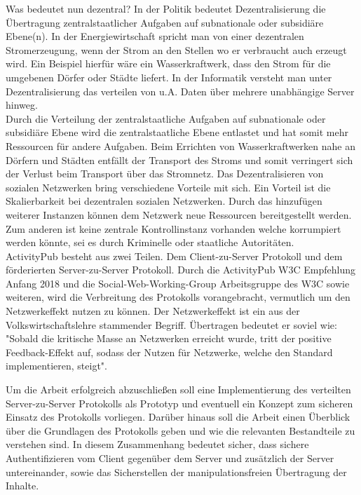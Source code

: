 {	Was bedeutet nun dezentral? In der Politik bedeutet Dezentralisierung \glqq die Übertragung zentralstaatlicher Aufgaben auf subnationale oder subsidiäre Ebene(n)\grqq\cite{wikipedia-dezentralisierung-politik}. In der Energiewirtschaft spricht man von einer \glqq dezentralen Stromerzeugung\grqq, wenn der Strom an den Stellen wo er verbraucht auch erzeugt wird. Ein Beispiel hierfür wäre ein Wasserkraftwerk, dass den Strom für die umgebenen Dörfer oder Städte liefert\cite{wikipedia-dezentralisierung-energie}. In der Informatik versteht man unter Dezentralisierung das verteilen von u.A. Daten über mehrere unabhängige Server hinweg.\\
	
	Durch die Verteilung der zentralstaatliche Aufgaben auf subnationale oder subsidiäre Ebene wird die zentralstaatliche Ebene entlastet und hat somit mehr Ressourcen für andere Aufgaben. Beim Errichten von Wasserkraftwerken nahe an Dörfern und Städten entfällt der Transport des Stroms und somit verringert sich der Verlust beim Transport über das Stromnetz. Das Dezentralisieren von sozialen Netzwerken bring verschiedene Vorteile mit sich. Ein Vorteil ist die Skalierbarkeit bei dezentralen sozialen Netzwerken. Durch das hinzufügen weiterer Instanzen können dem Netzwerk neue Ressourcen bereitgestellt werden. Zum anderen ist keine zentrale Kontrollinstanz vorhanden welche korrumpiert werden könnte, sei es durch Kriminelle oder staatliche Autoritäten.\\
		
	ActivityPub besteht aus zwei Teilen. Dem Client-zu-Server Protokoll und dem förderierten Server-zu-Server Protokoll. Durch die ActivityPub W3C Empfehlung Anfang 2018 und die Social-Web-Working-Group Arbeitsgruppe des W3C sowie weiteren, wird die Verbreitung des Protokolls vorangebracht, vermutlich um den Netzwerkeffekt nutzen zu können. Der Netzwerkeffekt ist ein aus der Volkswirtschaftslehre stammender Begriff. Übertragen bedeutet er soviel wie: "Sobald die kritische Masse an Netzwerken erreicht wurde, tritt der positive Feedback-Effekt auf, sodass der Nutzen für Netzwerke, welche den Standard implementieren, steigt".\\
		
	Um die Arbeit erfolgreich abzuschließen soll eine Implementierung des verteilten Server-zu-Server Protokolls als Prototyp und eventuell ein Konzept zum sicheren Einsatz des Protokolls vorliegen. Darüber hinaus soll die Arbeit einen Überblick über die Grundlagen des Protokolls geben und wie die relevanten Bestandteile zu verstehen sind. In diesem Zusammenhang bedeutet \glqq sicher\grqq, dass sichere Authentifizieren vom Client gegenüber dem Server und zusätzlich der Server untereinander, sowie das Sicherstellen der manipulationsfreien Übertragung der Inhalte.
	
}
